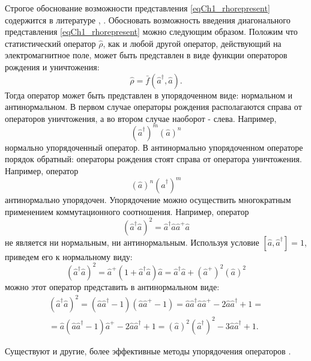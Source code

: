 Строгое обоснование возможности представления \eqref{eqCh1_rhorepresent}
содержится в литературе \cite{bQuantumOpticsAndRadioPhisicsLecture1966},
\cite{bKaluderSudershan1970}. 
Обосновать возможность введения диагонального представления
\eqref{eqCh1_rhorepresent} можно следующим образом. Положим что
статистический оператор $\hat{\rho}$, как и любой другой оператор,
действующий на электромагнитное поле, может быть представлен в виде
функции операторов рождения и уничтожения:
\[
\hat{\rho} = \bar{f}\left(\hat{a}^{\dag}, \hat{a}\right).
\]
Тогда оператор может быть представлен в упорядоченном виде: нормальном
и антинормальном. В первом случае операторы рождения располагаются
справа от операторов уничтожения, а во втором случае наоборот - слева.
Например, 
\[
\left(\hat{a}^{\dag}\right)^m\left(\hat{a}\right)^n
\]
нормально упорядоченный оператор. В антинормально упорядоченном
операторе порядок обратный: операторы рождения стоят справа от
оператора уничтожения. Например, оператор 
\[
\left(\hat{a}\right)^n\left(\hat{a}^{\dag}\right)^m
\]
антинормально упорядочен. Упорядочение можно осуществить многократным
применением коммутационного соотношения. Например, оператор  
\[
\left(\hat{a}^{\dag}\hat{a}\right)^2 =
\hat{a}^{\dag}\hat{a}\hat{a}^{+}\hat{a} 
\]
не является ни нормальным, ни антинормальным. Используя условие 
$\left[\hat{a},\hat{a}^{\dag}\right] = 1$,
приведем его к нормальному виду: 
\[
\left(\hat{a}^{\dag}\hat{a}\right)^2 = \hat{a}^{+}\left(1 +
\hat{a}^{\dag}\hat{a}\right)\hat{a} = 
\hat{a}^{\dag}\hat{a} + \left(\hat{a}^{+}\right)^2\left(\hat{a}\right)^2
\]
можно этот оператор представить в антинормальном виде:
\begin{eqnarray}
\left(\hat{a}^{\dag}\hat{a}\right)^2 = 
\left(\hat{a}\hat{a}^{\dag} - 1\right) \left(\hat{a}\hat{a}^{+} -
1\right) = \hat{a}\hat{a}^{\dag} \hat{a}\hat{a}^{+} - 2
\hat{a}\hat{a}^{\dag} + 1 =
\nonumber \\
= \hat{a}\left(\hat{a}\hat{a}^{\dag} - 1\right)\hat{a}^{+} -
2\hat{a}\hat{a}^{\dag} + 1 = 
\left(\hat{a}\right)^2\left(\hat{a}^{\dag}\right)^2 - 3
\hat{a}\hat{a}^{\dag} + 1.
\nonumber
\end{eqnarray}

Существуют и другие, более эффективные методы упорядочения операторов
\cite{bLuisell1972}.


